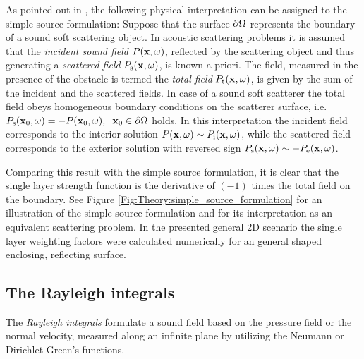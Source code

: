 \vspace{3mm}
As pointed out in \cite{Schultz2014:Comparing_approaches, Fazi2010, Fazi2013:Equivalent_scattering, Zotter2013:uniqueness}, the following physical interpretation can be assigned to the simple source formulation: 
Suppose that the surface $\partial \Omega$ represents the boundary of a sound soft scattering object.
In acoustic scattering problems it is assumed that the \emph{incident sound field} $P(\mathbf{x},\omega)$, reflected by the scattering object and thus generating a \emph{scattered field} $P_{\mathrm{s}}(\mathbf{x},\omega)$, is known a priori.
The field, measured in the presence of the obstacle is termed the \emph{total field} $P_{\mathrm{t}}(\mathbf{x},\omega)$, is given by the sum of the incident and the scattered fields. 
In case of a sound soft scatterer the total field obeys homogeneous boundary conditions on the scatterer surface, i.e. $P_{\mathrm{s}}(\mathbf{x}_0,\omega) = -P(\mathbf{x}_0,\omega), \hspace{.2cm} \mathbf{x}_0 \in \partial \Omega$ holds.
In this interpretation the incident field corresponds to the interior solution $P(\mathbf{x},\omega) \sim P_{\mathrm{i}}(\mathbf{x},\omega)$, while the scattered field corresponds to the exterior solution with reversed sign $P_{\mathrm{s}}(\mathbf{x},\omega) \sim -P_{\mathrm{e}}(\mathbf{x},\omega)$.

Comparing this result with the simple source formulation, it is clear that the single layer strength function is the derivative of $(-1)$ times the total field on the boundary.
See Figure \ref{Fig:Theory:simple_source_formulation} for an illustration of the simple source formulation and for its interpretation as an equivalent scattering problem.
In the presented general 2D scenario the single layer weighting factors were calculated numerically for an general shaped enclosing, reflecting surface.

\subsection{The Rayleigh integrals}
\label{Section:Theory:Rayleigh}

The \emph{Rayleigh integrals} formulate a sound field based on the pressure field or the normal velocity, measured along an infinite plane by utilizing the Neumann or Dirichlet Green's functions.

